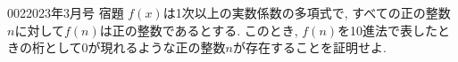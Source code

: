 \begin{prob}{002}{}{2023年3月号 宿題}
 $f(x)$は1次以上の実数係数の多項式で, すべての正の整数$n$に対して$f(n)$は正の整数であるとする. このとき, $f(n)$を10進法で表したときの桁として$0$が現れるような正の整数$n$が存在することを証明せよ.
\end{prob}
